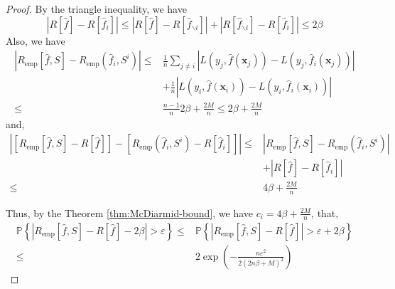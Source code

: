 \begin{proof}
	By the triangle inequality, we have
	\begin{equation}
		\left|R[\hat{f}]-R[\hat{f}_{i}]\right|\leq\left|R[\hat{f}]-R[\hat{f}_{\backslash i}]\right|+\left|R[\hat{f}_{\backslash i}]-R[\hat{f}_{i}]\right|\leq 2\beta
	\end{equation}
	Also, we have
	\begin{equation}
		\begin{aligned}
			\left|R_{\text{emp}}[\hat{f},S]-R_{\text{emp}}\left(\hat{f}_{i},S^{i}\right)\right|\leq & \frac{1}{n}\sum_{j\neq i}\left|L\left(y_{j},\hat{f}(\mathbf{x}_{j})\right)-L\left(y_{j},\hat{f}_{i}(\mathbf{x}_{j})\right)\right| \\
			                                                                                        & +\frac{1}{n}\left|L\left(y_{i},\hat{f}(\mathbf{x}_{i})\right)-L\left(y_{i},\hat{f}_{i}(\mathbf{x}_{i})\right)\right|              \\
			\leq                                                                                    & \frac{n-1}{n}2\beta+\frac{2M}{n}\leq 2\beta+\frac{2M}{n}
		\end{aligned}
	\end{equation}
	and,
	\begin{equation}
		\begin{aligned}
			\left|\left[R_{\text{emp}}[\hat{f},S]-R[\hat{f}]\right]-\left[R_{\text{emp}}\left(\hat{f}_{i},S^{i}\right)-R[\hat{f}_{i}]\right]\right|\leq & \left|R_{\text{emp}}[\hat{f},S]-R_{\text{emp}}\left(\hat{f}_{i},S^{i}\right)\right| \\
			                                                                                                                                            & +\left|R[\hat{f}]-R[\hat{f}_{i}]\right|                                             \\
			\leq                                                                                                                                        & 4\beta+\frac{2M}{n}
		\end{aligned}
	\end{equation}

	Thus, by the Theorem \ref{thm:McDiarmid-bound}, we have $c_{i}=4\beta+\frac{2M}{n}$, that,
	\begin{equation}
		\begin{aligned}
			\mathbb{P}\left\{|R_{\text{emp}}[\hat{f},S]-R[\hat{f}]-2\beta|>\varepsilon\right\}\leq & \mathbb{P}\left\{|R_{\text{emp}}[\hat{f},S]-R[\hat{f}]|>\varepsilon+2\beta\right\} \\
			\leq                                                                                   & 2\exp\left(-\frac{n\varepsilon^{2}}{2(2n\beta+M)^{2}}\right)
		\end{aligned}
	\end{equation}
\end{proof}

